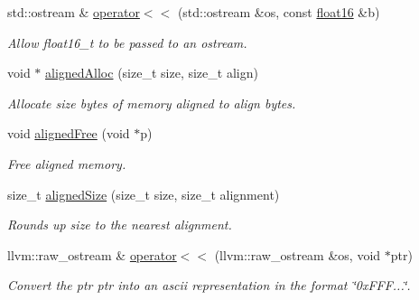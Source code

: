 \begin{DoxyCompactItemize}
\item 
\mbox{\label{namespaceglow_aebce7475aa5021b9b6c5092b14f96e22}} 
std\+::ostream \& \hyperlink{namespaceglow_aebce7475aa5021b9b6c5092b14f96e22}{operator$<$$<$} (std\+::ostream \&os, const \hyperlink{classglow_1_1float16}{float16} \&b)
\begin{DoxyCompactList}\small\item\em Allow float16\+\_\+t to be passed to an ostream. \end{DoxyCompactList}\item 
\mbox{\label{namespaceglow_ac962e2d08e102e7eb14c728068067e71}} 
void $\ast$ \hyperlink{namespaceglow_ac962e2d08e102e7eb14c728068067e71}{aligned\+Alloc} (size\+\_\+t size, size\+\_\+t align)
\begin{DoxyCompactList}\small\item\em Allocate {\ttfamily size} bytes of memory aligned to {\ttfamily align} bytes. \end{DoxyCompactList}\item 
\mbox{\label{namespaceglow_aa1285b944f655c06ff1accf71d3ea9a5}} 
void \hyperlink{namespaceglow_aa1285b944f655c06ff1accf71d3ea9a5}{aligned\+Free} (void $\ast$p)
\begin{DoxyCompactList}\small\item\em Free aligned memory. \end{DoxyCompactList}\item 
\mbox{\label{namespaceglow_abd4bd0099a5796fa484ffce3d628bdea}} 
size\+\_\+t \hyperlink{namespaceglow_abd4bd0099a5796fa484ffce3d628bdea}{aligned\+Size} (size\+\_\+t size, size\+\_\+t alignment)
\begin{DoxyCompactList}\small\item\em Rounds up {\ttfamily size} to the nearest {\ttfamily alignment}. \end{DoxyCompactList}\item 
\mbox{\label{namespaceglow_af4cc5003864817f305e3351f82dbef78}} 
llvm\+::raw\+\_\+ostream \& \hyperlink{namespaceglow_af4cc5003864817f305e3351f82dbef78}{operator$<$$<$} (llvm\+::raw\+\_\+ostream \&os, void $\ast$ptr)
\begin{DoxyCompactList}\small\item\em Convert the ptr {\ttfamily ptr} into an ascii representation in the format \char`\"{}0x\+F\+F\+F...\char`\"{}. \end{DoxyCompactList}\item 

\end{DoxyCompactItemize}
